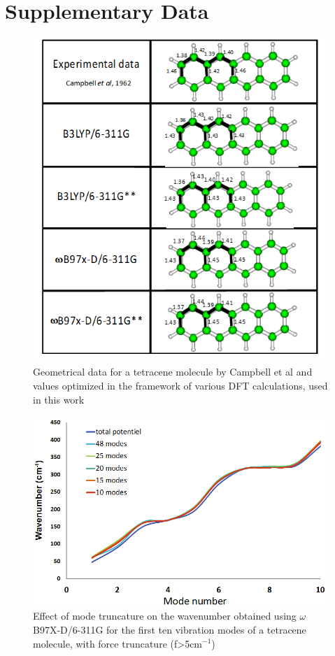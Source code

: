  \newpage
 
 \section*{Supplementary Data}
 
 \begin{figure}[h]
 	\centering
 	\includegraphics[scale=0.8]{image/geometrical-data}
 	\caption[Geometrical data for a tetracene molecule]{Geometrical data for a tetracene molecule by Campbell et al \cite{campbell1962crystal} and values optimized in the framework of various DFT calculations, used in this work}
 \end{figure}
 
 \begin{figure}[h]
 	\centering
 	\includegraphics[scale=0.8]{image/mode-trunc}
 	\caption[Effect of mode truncature on the first ten mode on wavenumber of tetracene ]{Effect of mode truncature on the wavenumber obtained using $\omega$B97X-D/6-311G for the first ten vibration modes of a tetracene molecule, with force truncature (f>5cm$^{-1}$)}
 \end{figure}